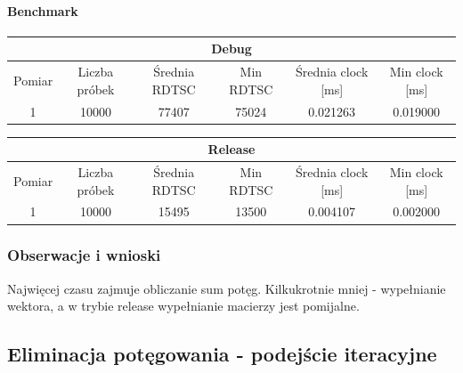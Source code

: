 \documentclass{article}
\begin{document}
	\paragraph{Benchmark}
	\begin{center}
		\begin{tabular}{|c|c|c|c|c|c|} \hline
			\multicolumn{6}{|c|}{Debug} \\\hline
			Pomiar  & Liczba próbek & Średnia RDTSC & Min RDTSC & Średnia clock [ms] & Min clock [ms] \\\hline
			\hline
			1 & 10000 & 77407 & 75024 & 0.021263 & 0.019000 \\\hline
			
		\end{tabular}
	\end{center}
	\begin{center}
		\begin{tabular}{|c|c|c|c|c|c|} \hline
			\multicolumn{6}{|c|}{Release} \\\hline
			Pomiar  & Liczba próbek & Średnia RDTSC & Min RDTSC & Średnia clock [ms] & Min clock [ms] \\\hline
			\hline
			1 & 10000 & 15495 & 13500 & 0.004107 & 0.002000 \\\hline
			
		\end{tabular}
	\end{center}
	
	\subsubsection{Obserwacje i wnioski}
	Najwięcej czasu zajmuje obliczanie sum potęg. Kilkukrotnie mniej - wypełnianie wektora, a w trybie release wypełnianie macierzy jest pomijalne.
	
	
	\pagebreak
	\subsection{Eliminacja potęgowania - podejście iteracyjne}
\end{document}
